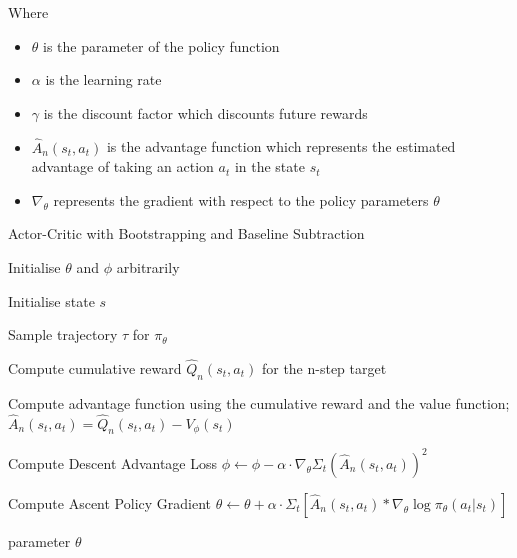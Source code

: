 \documentclass{article}
\begin{document}
Where 
\begin{itemize}[itemsep=0pt]
\renewcommand\labelitemi{.}
\item $\theta$ is the parameter of the policy function
\item $\alpha$ is the learning rate
\item $\gamma$ is the discount factor which discounts future rewards
\item $\hat{A}_n(s_t,a_t)$ is the advantage function which represents the estimated advantage of taking an action $a_t$ in the state $s_t$
\item $\nabla_\theta$ represents the gradient with respect to the policy parameters $\theta$
\end{itemize}

\begin{algorithm}[htbp]
\caption{Actor-Critic with Bootstrapping and Baseline Subtraction}
\SetAlgoLined
\DontPrintSemicolon
\small %
Initialise $\theta$ and $\phi$ arbitrarily\;\\
{
    Initialise state $s$\;
     \item Sample trajectory $\tau$ for $\pi_\theta$
     \item
    {
     \item Compute cumulative reward $\hat{Q}_n(s_t,a_t)$  for the n-step target
     \item Compute advantage function using the cumulative reward and the value function;
     \(\hat{A}_n(s_t,a_t) = \hat{Q}_n(s_t,a_t) - V_\phi(s_t)\)
    }
    \item Compute Descent Advantage Loss
    \newline
     \(\phi \leftarrow \phi - \alpha \cdot \nabla_\theta\Sigma_t(\hat{A}_n(s_t,a_t))^2\) 
     \item Compute Ascent Policy Gradient
     \newline 
    \(\theta \leftarrow \theta + \alpha \cdot \Sigma_t[\hat{A}_n(s_t,a_t)*\nabla_\theta\log\pi_\theta(a_t|s_t)]\)
}
\State \Return parameter $\theta$
\end{algorithm}
\end{document}
